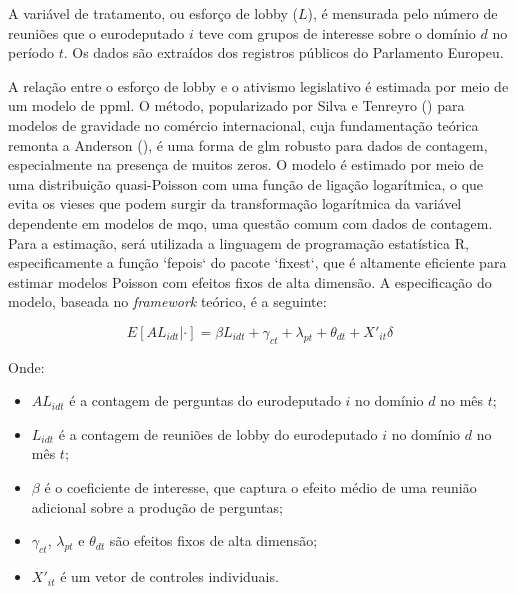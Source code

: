 A variável de tratamento, ou esforço de lobby ($L$), é mensurada pelo número de reuniões que o eurodeputado $i$ teve com grupos de interesse sobre o domínio $d$ no período $t$. Os dados são extraídos dos registros públicos do Parlamento Europeu.


A relação entre o esforço de lobby e o ativismo legislativo é estimada por meio de um modelo de \acrfull{ppml}. O método, popularizado por Silva e Tenreyro (\citeyear{silva2006log}) para modelos de gravidade no comércio internacional, cuja fundamentação teórica remonta a Anderson (\citeyear{anderson1979theoretical}), é uma forma de \acrfull{glm} robusto para dados de contagem, especialmente na presença de muitos zeros. O modelo é estimado por meio de uma distribuição quasi-Poisson com uma função de ligação logarítmica, o que evita os vieses que podem surgir da transformação logarítmica da variável dependente em modelos de \acrfull{mqo}, uma questão comum com dados de contagem. Para a estimação, será utilizada a linguagem de programação estatística R, especificamente a função `fepois` do pacote `fixest`, que é altamente eficiente para estimar modelos Poisson com efeitos fixos de alta dimensão. A especificação do modelo, baseada no \textit{framework} teórico, é a seguinte:

\begin{equation}
    \label{eq:modelo_final}
    E[AL_{idt} | \cdot] = \beta L_{idt} + \gamma_{ct} + \lambda_{pt} + \theta_{dt} + X'_{it}\delta
\end{equation}

Onde:
\begin{itemize}
    \item $AL_{idt}$ é a contagem de perguntas do eurodeputado $i$ no domínio $d$ no mês $t$;
    \item $L_{idt}$ é a contagem de reuniões de lobby do eurodeputado $i$ no domínio $d$ no mês $t$;
    \item $\beta$ é o coeficiente de interesse, que captura o efeito médio de uma reunião adicional sobre a produção de perguntas;
    \item $\gamma_{ct}$, $\lambda_{pt}$ e $\theta_{dt}$ são efeitos fixos de alta dimensão;
    \item $X'_{it}$ é um vetor de controles individuais.
\end{itemize}

